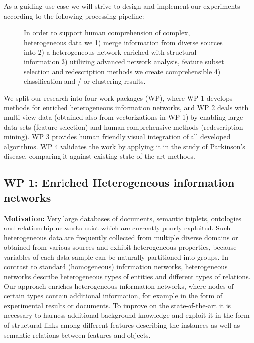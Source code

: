 \documentclass[a4paper,11pt]{article}
\begin{document}
As a guiding use case we will strive to design and implement our experiments according to the following processing pipeline:
\\[-0,3cm]

\begin{figure}[ht]
	\centering
	\caption{In order to  support human comprehension of complex, heterogeneous data we 1) merge information from diverse sources into 2) a heterogeneous network enriched with structural information 3) utilizing advanced network analysis, feature subset selection and redescription methods we create comprehensible 4) classification and / or clustering results.}
	\label{fig:pipeline}
\end{figure}
We split our research into four work packages (WP), where WP 1 develops methods for enriched heterogeneous information networks, and WP 2 deals with multi-view data (obtained also from vectorizations in WP 1) by enabling large data sets (feature selection) and human-comprehensive methods (redescription mining). WP 3 provides human friendly visual integration of all developed algorithms. WP 4 validates the work by applying it in the study of Parkinson's disease, comparing it against existing state-of-the-art methods.

\subsection{WP 1: Enriched Heterogeneous information networks}
\textbf{Motivation:}
Very large databases of documents, semantic triplets, ontologies and relationship networks exist which are currently poorly exploited. Such heterogeneous data are frequently collected from multiple diverse domains or obtained from various sources and exhibit heterogeneous properties, because variables of each data sample can be naturally partitioned into groups. In contrast to standard (homogeneous) information networks, heterogeneous networks describe heterogeneous types of entities and different types of relations. Our approach enriches heterogeneous information networks, where nodes of certain types contain additional information, for example in the form of experimental results or documents. To improve on the state-of-the-art it is necessary to harness additional background knowledge and exploit it in the form of structural links among different features describing the instances as well as semantic relations between features and objects.
 
\end{document}
